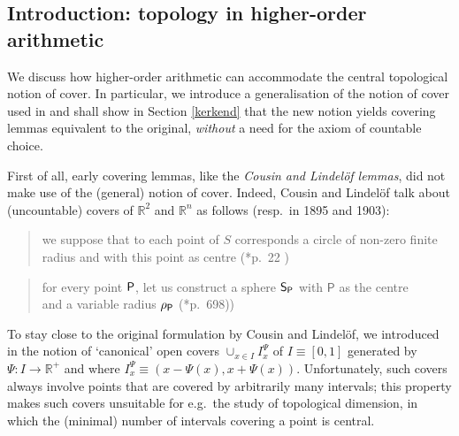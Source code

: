 \documentclass[reqno]{amsart}
\def\R{{\mathbb  R}}
\def\di{\rightarrow}
\numberwithin{equation}{section}
\numberwithin{thm}{section}
\begin{document}
\subsection{Introduction: topology in higher-order arithmetic}\label{introke}
We discuss how higher-order arithmetic can accommodate the central topological notion of cover.  
In particular, we introduce a generalisation of the notion of cover used in \cite{dagsamIII, dagsamV} and shall show in Section \ref{kerkend} that the new notion yields covering lemmas
equivalent to the original, \emph{without} a need for the axiom of countable choice. 

\smallskip

First of all, early covering lemmas, like the \emph{Cousin and Lindel\"of lemmas}, did not make use of the (general) notion of cover. 
Indeed, Cousin and Lindel\"of talk about (uncountable) covers of $\R^{2}$ and $\R^{n}$ as follows (resp.\ in 1895 and 1903): 
\begin{quote}
we suppose that to each point of $S$ corresponds a circle of non-zero finite radius and with this point as centre (\cite{cousin1}*{p.\ 22} )
\end{quote}
\begin{quote}
for every point $\textsf{\textup{P}}$, let us construct a sphere $\textsf{\textup{S}}_{\textsf{\textup{P}}}$ with $\textsf{P}$ as the centre\\ and a variable radius $\rho_{\textsf{\textup{P}}}$ (\cite{blindeloef}*{p.\ 698}))
\end{quote}
To stay close to the original formulation by Cousin and Lindel\"of, we introduced in \cite{dagsamIII, dagsamV} the notion of `canonical' open covers $\cup_{x\in I}I_{x}^{\Psi}$ of $I\equiv [0,1]$ generated by $\Psi:I\di \R^{+}$ and where $I_{x}^{\Psi}\equiv (x-\Psi(x), x+\Psi(x))$.
Unfortunately, such covers always involve points that are covered by arbitrarily many intervals; this property makes such covers unsuitable for e.g.\ the study of topological dimension, in which the (minimal) number of intervals covering a point is central.  

\smallskip
\end{document}
